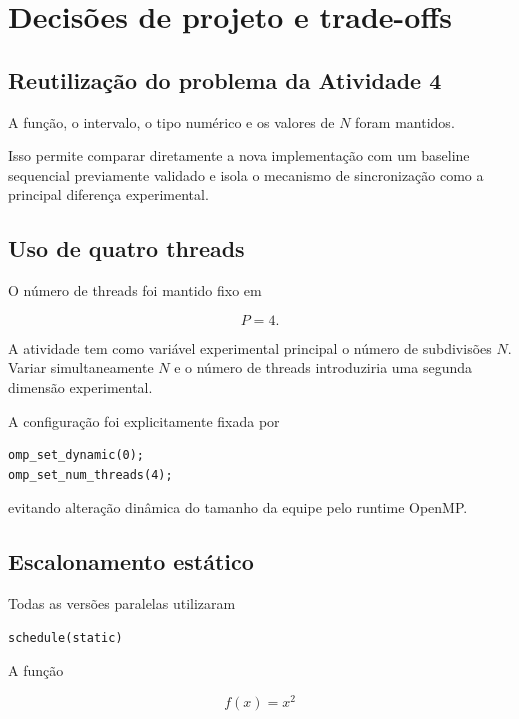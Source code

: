 \section{Decisões de projeto e trade-offs}

\label{sec:atvd06-decisoes}

\subsection{Reutilização do problema da Atividade 4}

A função, o intervalo, o tipo numérico e os valores de \(N\) foram mantidos.

Isso permite comparar diretamente a nova implementação com um baseline
sequencial previamente validado e isola o mecanismo de sincronização como a
principal diferença experimental.


\subsection{Uso de quatro threads}

O número de threads foi mantido fixo em

\begin{equation}
    P=4.
\end{equation}

A atividade tem como variável experimental principal o número de
subdivisões \(N\). Variar simultaneamente \(N\) e o número de threads
introduziria uma segunda dimensão experimental.

A configuração foi explicitamente fixada por

\begin{verbatim}
omp_set_dynamic(0);
omp_set_num_threads(4);
\end{verbatim}

evitando alteração dinâmica do tamanho da equipe pelo runtime OpenMP.


\subsection{Escalonamento estático}

Todas as versões paralelas utilizaram

\begin{verbatim}
schedule(static)
\end{verbatim}

A função

\begin{equation}
    f(x)=x^2
\end{equation}

